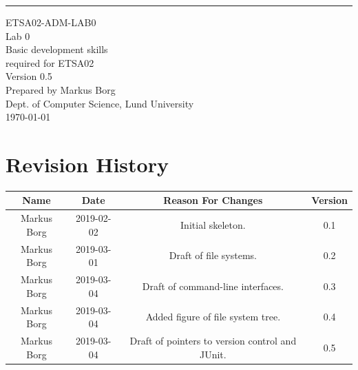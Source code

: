 \documentclass{scrreprt}
\date{}
\def\myversion{0.5 }
\begin{document}
\begin{flushright}
    \rule{16cm}{5pt}\vskip1cm
    \begin{bfseries}
    	\LARGE{ETSA02-ADM-LAB0}\\
    	\vspace{1.5cm}
        \Huge{Lab 0}\\
        \vspace{0.5cm}
        Basic development skills\\
        \vspace{0.5cm}
        required for ETSA02\\
        \vspace{1.5cm}
        \LARGE{Version \myversion}\\
        \vspace{1.5cm}
        Prepared by Markus Borg\\
        Dept. of Computer Science, Lund University\\
        \vspace{1.5cm}
        \today\\
    \end{bfseries}
\end{flushright}


\chapter*{Revision History}

\begin{center}
    \begin{tabular}{|c|c|c|c|}
        \hline
	    Name & Date & Reason For Changes & Version\\
        \hline
	    Markus Borg & 2019-02-02 & Initial skeleton. & 0.1\\
        \hline
        Markus Borg & 2019-03-01 & Draft of file systems. & 0.2\\
        \hline
        Markus Borg & 2019-03-04 & Draft of command-line interfaces. & 0.3\\
        \hline
        Markus Borg & 2019-03-04 & Added figure of file system tree. & 0.4\\
        \hline
        Markus Borg & 2019-03-04 & Draft of pointers to version control and JUnit. & 0.5\\
        \hline
    \end{tabular}
\end{center}
\end{document}
